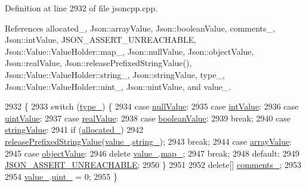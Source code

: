 Definition at line 2932 of file jsoncpp.\+cpp.



References allocated\+\_\+, Json\+::array\+Value, Json\+::boolean\+Value, comments\+\_\+, Json\+::int\+Value, J\+S\+O\+N\+\_\+\+A\+S\+S\+E\+R\+T\+\_\+\+U\+N\+R\+E\+A\+C\+H\+A\+B\+LE, Json\+::\+Value\+::\+Value\+Holder\+::map\+\_\+, Json\+::null\+Value, Json\+::object\+Value, Json\+::real\+Value, Json\+::release\+Prefixed\+String\+Value(), Json\+::\+Value\+::\+Value\+Holder\+::string\+\_\+, Json\+::string\+Value, type\+\_\+, Json\+::\+Value\+::\+Value\+Holder\+::uint\+\_\+, Json\+::uint\+Value, and value\+\_\+.


\begin{DoxyCode}
2932               \{
2933   \textcolor{keywordflow}{switch} (\hyperlink{class_json_1_1_value_abd222c2536dc88bf330dedcd076d2356}{type\_}) \{
2934   \textcolor{keywordflow}{case} \hyperlink{namespace_json_a7d654b75c16a57007925868e38212b4ea7d9899633b4409bd3fc107e6737f8391}{nullValue}:
2935   \textcolor{keywordflow}{case} \hyperlink{namespace_json_a7d654b75c16a57007925868e38212b4eae5a9d708d5c9e23ae9bf98898522512d}{intValue}:
2936   \textcolor{keywordflow}{case} \hyperlink{namespace_json_a7d654b75c16a57007925868e38212b4eaea788d9a3bb00adc6d68d97d43e1ccd3}{uintValue}:
2937   \textcolor{keywordflow}{case} \hyperlink{namespace_json_a7d654b75c16a57007925868e38212b4eab837c7b869c14d8be712deb45c9e490e}{realValue}:
2938   \textcolor{keywordflow}{case} \hyperlink{namespace_json_a7d654b75c16a57007925868e38212b4ea14c30dbf4da86f7b809be299f671f7fd}{booleanValue}:
2939     \textcolor{keywordflow}{break};
2940   \textcolor{keywordflow}{case} \hyperlink{namespace_json_a7d654b75c16a57007925868e38212b4ea804ef857affea2d415843c73f261c258}{stringValue}:
2941     \textcolor{keywordflow}{if} (\hyperlink{class_json_1_1_value_ae0126c80dc4907aad94088553fc7632b}{allocated\_})
2942       \hyperlink{namespace_json_a48f4e3ea655e3b4a5d7f892c81f00511}{releasePrefixedStringValue}(\hyperlink{class_json_1_1_value_aef578244546212705b9f81eb84d7e151}{value\_}.\hyperlink{union_json_1_1_value_1_1_value_holder_a70ac2b153bc405527baa3850d2ddc3cb}{string\_});
2943     \textcolor{keywordflow}{break};
2944   \textcolor{keywordflow}{case} \hyperlink{namespace_json_a7d654b75c16a57007925868e38212b4eadc8f264f36b55b063c78126b335415f4}{arrayValue}:
2945   \textcolor{keywordflow}{case} \hyperlink{namespace_json_a7d654b75c16a57007925868e38212b4eae8386dcfc36d1ae897745f7b4f77a1f6}{objectValue}:
2946     \textcolor{keyword}{delete} \hyperlink{class_json_1_1_value_aef578244546212705b9f81eb84d7e151}{value\_}.\hyperlink{union_json_1_1_value_1_1_value_holder_a1e7a5b86d4f52234f55c847ad1ce389a}{map\_};
2947     \textcolor{keywordflow}{break};
2948   \textcolor{keywordflow}{default}:
2949     \hyperlink{jsoncpp_8cpp_aa5e619e3e9388f6376a344dd8462c9cc}{JSON\_ASSERT\_UNREACHABLE};
2950   \}
2951 
2952   \textcolor{keyword}{delete}[] \hyperlink{class_json_1_1_value_a2016564cabc7a29208e97bd0b782a4e4}{comments\_};
2953 
2954   \hyperlink{class_json_1_1_value_aef578244546212705b9f81eb84d7e151}{value\_}.\hyperlink{union_json_1_1_value_1_1_value_holder_aab65665dc15a24a29a8e93cdeeaa7e50}{uint\_} = 0;
2955 \}
\end{DoxyCode}


